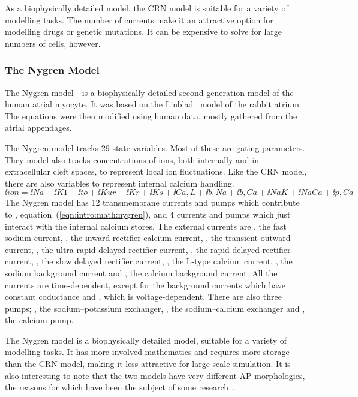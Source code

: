 As a biophysically detailed model, the CRN model is suitable for a variety of
modelling tasks.
The number of currents make it an attractive option for modelling drugs or
genetic mutations.
It can be expensive to solve for large numbers of cells, however.

\subsubsection{The Nygren Model}

The Nygren model~\cite{Nygren1998}\ is a biophysically detailed second
generation model of the human atrial myocyte.
It was based on the Linblad~\cite{Lindblad1996} model of the rabbit atrium.
The equations were then modified using human data, mostly gathered from the
atrial appendages.

The Nygren model tracks 29 state variables.
Most of these are gating parameters.
They model also tracks concentrations of ions, both internally and in
extracellular cleft spaces, to represent local ion fluctuations.
Like the CRN model, there are also variables to represent internal calcium
handling.
\begin{equation}
\label{eqn:intro:math:nygren}
\ii{ion} = \ii{Na} + \ii{K1} + \ii{to} + \ii{Kur} + \ii{Kr} + \ii{Ks} +
\ii{Ca,L} + \ii{b,Na} + \ii{b,Ca} + \ii{NaK} + \ii{NaCa} + \ii{p,Ca}
\end{equation}
The Nygren model has 12 transmembrane currents and pumps which contribute to ,
equation~(\ref{eqn:intro:math:nygren}), and 4 currents and
pumps which just interact with the internal calcium stores.
The external currents are , the fast sodium current, , the inward
rectifier calcium current, , the transient outward current, , the
ultra-rapid delayed rectifier current, , the rapid delayed rectifier
current, , the slow delayed rectifier current, , the L-type
calcium current, , the sodium background current and , the
calcium background current.
All the currents are time-dependent, except for the background currents which
have constant coductance and , which is voltage-dependent.
There are also three pumps; , the sodium--potassium exchanger,
, the sodium--calcium exchanger and , the calcium pump.

The Nygren model is a biophysically detailed model, suitable for a variety of
modelling tasks.
It has more involved mathematics and requires more storage than the CRN model,
making it less attractive for large-scale simulation.
It is also interesting to note that the two models have very different
AP morphologies, the reasons for which have been the subject of some
research~\cite{Nygren2001,Syed2005,Cherry2008}.

